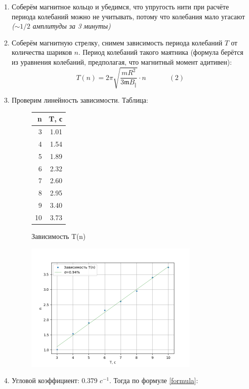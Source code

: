 \documentclass[12pt,a4paper]{article}
\newcommand{\mk}{\mathfrak}
\begin{document}
\begin{enumerate}
  \item Соберём магнитное кольцо и убедимся, что упругость
  нити при расчёте периода колебаний можно не учитывать, потому что колебания мало угасают \textit{($\sim1/2$ амплитуды за 3 минуты)}
  \item Соберём магнитную стрелку, снимем зависимость периода колебаний $T$ от количества шариков $n$. Период колебаний такого маятника \scriptsize(формула берётся из уравнения колебаний, предполагая, что магнитный момент адитивен)\normalsize:
  \begin{equation}
    T(n) = 2\pi \sqrt{\frac{mR^2}{3\mk m B_\Vert }} \cdot n\ \ \ \ \ \ \ \ \ \ \ \ \ \ \ (2)
    \label{formula}
  \end{equation}
  \item Проверим линейность зависимости. Таблица:
  \begin{figure}[H]
    \begin{tabular}{|r|r|}
    n & T, с \\
    \midrule
     3 & 1.01 \\
     4 & 1.54 \\
     5 & 1.89 \\
     6 & 2.32 \\
     7 & 2.60 \\
     8 & 2.95 \\
     9 & 3.40 \\
     10 &3.73 \\
    \end{tabular}
    \caption{Зависимость T(n)}
  \end{figure}
  \begin{figure}[H]
    \includegraphics*[width=0.8\textwidth]{T(n).png}
  \end{figure}
  \item Угловой коэффициент: 0.379 $c^{-1}$. Тогда по формуле \ref{formula}:
  
\end{enumerate}
\end{document}
